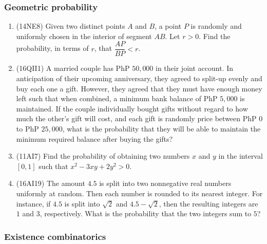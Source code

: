 \documentclass[10pt,paper=letter]{scrartcl}
\begin{document}
\subsubsection*{Geometric probability}

\begin{enumerate}

\item (14NE8) Given two distinct points $A$ and $B$, a point $P$ is randomly and uniformly chosen in the interior of segment $AB$. Let $r > 0$. Find the probability, in terms of $r$, that $\dfrac{AP}{BP} < r$.

\item (16QII1) A married couple has PhP $50,000$ in their joint account. In anticipation of their upcoming anniversary, they agreed to split-up evenly and buy each one a gift. However, they agreed that they must have enough money left such that when combined, a minimum bank balance of PhP $5,000$ is maintained. If the couple individually bought gifts without regard to how much the other's gift will cost, and each gift is randomly price between PhP $0$ to PhP $25,000$, what is the probability that they will be able to maintain the minimum required balance after buying the gifts?

\item (11AI7) Find the probability of obtaining two numbers $x$ and $y$ in the interval $[0,1]$ such that $x^2 - 3xy + 2y^2 > 0$.

\item (16AI19) The amount $4.5$ is split into two nonnegative real numbers uniformly at random. Then each number is rounded to its nearest integer. For instance, if $4.5$ is split into $\sqrt{2}$ and $4.5-\sqrt{2}$, then the resulting integers are $1$ and $3$, respectively. What is the probability that the two integers sum to $5$?

\end{enumerate}

\subsubsection*{Existence combinatorics}
\end{document}
